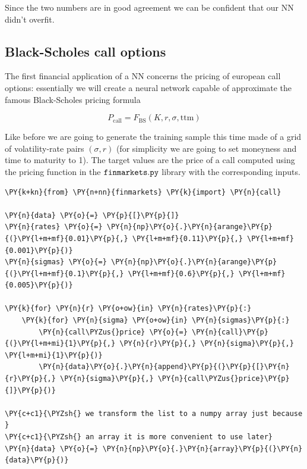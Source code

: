 Since the two numbers are in good agreement we can be confident that our
NN didn't overfit.

\subsection{Black-Scholes call
options}\label{black-scholes-call-options}

The first financial application of a NN concerns the pricing of european
call options: essentially we will create a neural network capable of
approximate the famous Black-Scholes pricing formula

\begin{equation} P_\textrm{call} = F_\textrm{BS}(K, r, \sigma, \mathrm{ttm})\end{equation}

Like before we are going to generate the training sample this time made
of a grid of volatility-rate pairs \((\sigma, r)\) (for simplicity we
are going to set moneyness and time to maturity to 1). The target values
are the price of a call computed using the pricing function in the
\(\tt{finmarkets.py}\) library with the corresponding inputs.

\begin{codebox}[breakable, size=fbox, boxrule=1pt, pad at break*=1mm,colback=cellbackground, colframe=cellborder]
\begin{Verbatim}[commandchars=\\\{\}]
\PY{k+kn}{from} \PY{n+nn}{finmarkets} \PY{k}{import} \PY{n}{call}
	
\PY{n}{data} \PY{o}{=} \PY{p}{[}\PY{p}{]}
\PY{n}{rates} \PY{o}{=} \PY{n}{np}\PY{o}{.}\PY{n}{arange}\PY{p}{(}\PY{l+m+mf}{0.01}\PY{p}{,} \PY{l+m+mf}{0.11}\PY{p}{,} \PY{l+m+mf}{0.001}\PY{p}{)}
\PY{n}{sigmas} \PY{o}{=} \PY{n}{np}\PY{o}{.}\PY{n}{arange}\PY{p}{(}\PY{l+m+mf}{0.1}\PY{p}{,} \PY{l+m+mf}{0.6}\PY{p}{,} \PY{l+m+mf}{0.005}\PY{p}{)}
	
\PY{k}{for} \PY{n}{r} \PY{o+ow}{in} \PY{n}{rates}\PY{p}{:}
    \PY{k}{for} \PY{n}{sigma} \PY{o+ow}{in} \PY{n}{sigmas}\PY{p}{:}
        \PY{n}{call\PYZus{}price} \PY{o}{=} \PY{n}{call}\PY{p}{(}\PY{l+m+mi}{1}\PY{p}{,} \PY{n}{r}\PY{p}{,} \PY{n}{sigma}\PY{p}{,} \PY{l+m+mi}{1}\PY{p}{)}
        \PY{n}{data}\PY{o}{.}\PY{n}{append}\PY{p}{(}\PY{p}{[}\PY{n}{r}\PY{p}{,} \PY{n}{sigma}\PY{p}{,} \PY{n}{call\PYZus{}price}\PY{p}{]}\PY{p}{)}
	
\PY{c+c1}{\PYZsh{} we transform the list to a numpy array just because }
\PY{c+c1}{\PYZsh{} an array it is more convenient to use later}
\PY{n}{data} \PY{o}{=} \PY{n}{np}\PY{o}{.}\PY{n}{array}\PY{p}{(}\PY{n}{data}\PY{p}{)}
\end{Verbatim}
\end{codebox}


